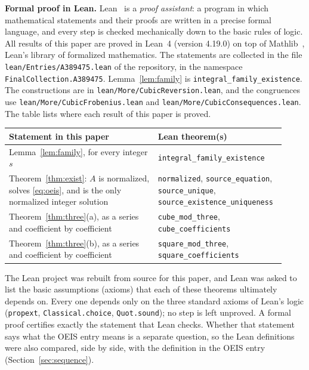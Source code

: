\documentclass[11pt,a4paper]{article}
\theoremstyle{definition}
\theoremstyle{remark}
\newcommand{\para}[1]{\par\medskip\noindent\textbf{#1}\enspace}
\begin{document}
\para{Formal proof in Lean.}
Lean~\cite{lean} is a \emph{proof assistant}: a program in which mathematical statements and their proofs are written
in a precise formal language, and every step is checked mechanically down to the basic rules of logic. All results of
this paper are proved in Lean~4 (version 4.19.0) on top of Mathlib~\cite{mathlib}, Lean's library of formalized
mathematics. The statements are collected in the file \texttt{lean/Entries/A389475.lean} of the repository,
in the namespace \texttt{FinalCollection.A389475}. Lemma~\ref{lem:family} is \texttt{integral\_family\_existence}. The constructions are in \texttt{lean/More/CubicReversion.lean}, and the congruences use \texttt{lean/More/CubicFrobenius.lean} and \texttt{lean/More/CubicConsequences.lean}.
The table lists where each result of this paper is proved.
\begin{center}\small\renewcommand{\arraystretch}{1.25}
\begin{tabular}{>{\raggedright\arraybackslash}p{0.52\linewidth}>{\raggedright\arraybackslash}p{0.4\linewidth}}
\toprule
Statement in this paper & Lean theorem(s)\\
\midrule
Lemma~\ref{lem:family}, for every integer $s$ & \texttt{integral\_\allowbreak{}family\_\allowbreak{}existence} \\
Theorem~\ref{thm:exist}: $A$ is normalized, solves \eqref{eq:oeis}, and is the only normalized integer solution & \texttt{normalized}, \texttt{source\_\allowbreak{}equation}, \texttt{source\_\allowbreak{}unique}, \texttt{source\_\allowbreak{}existence\_\allowbreak{}uniqueness} \\
Theorem~\ref{thm:three}(a), as a series and coefficient by coefficient & \texttt{cube\_\allowbreak{}mod\_\allowbreak{}three}, \texttt{cube\_\allowbreak{}coefficients} \\
Theorem~\ref{thm:three}(b), as a series and coefficient by coefficient & \texttt{square\_\allowbreak{}mod\_\allowbreak{}three}, \texttt{square\_\allowbreak{}coefficients} \\
\bottomrule
\end{tabular}
\end{center}
The Lean project was rebuilt from source for this paper, and Lean was asked to list the basic assumptions (axioms)
that each of these theorems ultimately depends on. Every one depends only on the three standard axioms of Lean's logic
(\texttt{propext}, \texttt{Classical.choice}, \texttt{Quot.sound}); no step is left unproved. A formal proof certifies
exactly the statement that Lean checks. Whether that statement says what the OEIS entry means is a separate question,
so the Lean definitions were also compared, side by side, with the definition in the OEIS entry
(Section~\ref{sec:sequence}).
\end{document}

